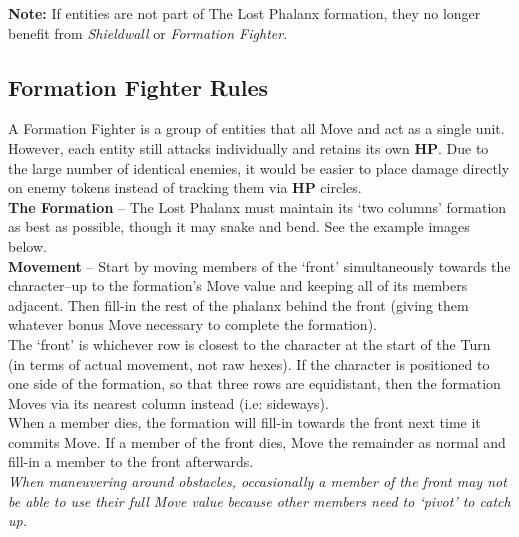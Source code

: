\begin{tcolorbox}
\textbf{Note:} If entities are not part of The Lost Phalanx formation, they no longer benefit from \emph{Shieldwall} or \emph{Formation Fighter}.
\end{tcolorbox}

\pagebreak

\subsection*{Formation Fighter Rules}
A Formation Fighter is a group of entities that all Move and act as a single unit. However, each entity still attacks individually and retains its own \textbf{HP}. Due to the large number of identical enemies, it would be easier to place damage directly on enemy tokens instead of tracking them via \textbf{HP} circles.\\

\textbf{The Formation} -- The Lost Phalanx must maintain its ‘two columns’ formation as best as possible, though it may snake and bend. See the example images below.\\

\textbf{Movement} -- Start by moving members of the ‘front’ simultaneously towards the character--up to the formation’s Move value and keeping all of its members adjacent. Then fill-in the rest of the phalanx behind the front (giving them whatever bonus Move necessary to complete the formation).\\
The ‘front’ is whichever row is closest to the character at the start of the Turn (in terms of actual movement, not raw hexes). If the character is positioned to one side of the formation, so that three rows are equidistant, then the formation Moves via its nearest column instead (i.e: sideways).\\
When a member dies, the formation will fill-in towards the front next time it commits Move. If a member of the front dies, Move the remainder as normal and fill-in a member to the front afterwards.\\
\emph{When maneuvering around obstacles, occasionally a member of the front may not be able to use their full Move value because other members need to ‘pivot’ to catch up.}

